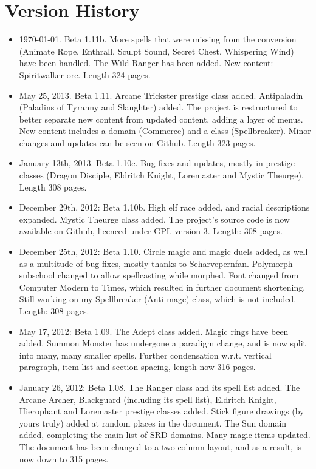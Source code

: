 \section{Version History}
\begin{itemize}
 \item \today. Beta 1.11b. More spells that were missing from the conversion (Animate Rope, Enthrall, Sculpt Sound, Secret Chest, Whispering Wind) have been handled. The Wild Ranger has been added. New content: Spiritwalker orc. Length 324 pages.
 \item May 25, 2013. Beta 1.11. Arcane Trickster prestige class added. Antipaladin (Paladins of Tyranny and Slaughter) added. The project is restructured to better separate new content from updated content, adding a layer of menus. New content includes a domain (Commerce) and a class (Spellbreaker). Minor changes and updates can be seen on Github. Length 323 pages.
 \item January 13th, 2013. Beta 1.10c. Bug fixes and updates, mostly in prestige classes (Dragon Disciple, Eldritch Knight, Loremaster and Mystic Theurge). Length 308 pages.
 \item December 29th, 2012: Beta 1.10b. High elf race added, and racial descriptions expanded. Mystic Theurge class added. The project's source code is now available on \href{https://github.com/Ernir/VancianToPsionics}{Github}, licenced under GPL version 3. Length: 308 pages.
 \item December 25th, 2012: Beta 1.10. Circle magic and magic duels added, as well as a multitude of bug fixes, mostly thanks to Seharvepernfan. Polymorph subschool changed to allow spellcasting while morphed. Font changed from Computer Modern to Times, which resulted in further document shortening. Still working on my Spellbreaker (Anti-mage) class, which is not included. Length: 308 pages.
 \item May 17, 2012: Beta 1.09. The Adept class added. Magic rings have been added. Summon Monster has undergone a paradigm change, and is now split into many, many smaller spells. Further condensation w.r.t. vertical paragraph, item list and section spacing, length now 316 pages.
 \item January 26, 2012: Beta 1.08. The Ranger class and its spell list added. The Arcane Archer, Blackguard (including its spell list), Eldritch Knight, Hierophant and Loremaster prestige classes added. Stick figure drawings (by yours truly) added at random places in the document. The Sun domain added, completing the main list of SRD domains. Many magic items updated. The document has been changed to a two-column layout, and as a result, is now down to 315 pages.

\end{itemize}
